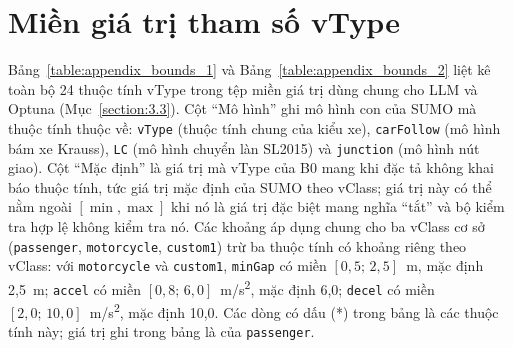 \documentclass[../main.tex]{subfiles}
\begin{document}
\section{Miền giá trị tham số vType}
\label{section:appendix_bounds}

Bảng~\ref{table:appendix_bounds_1} và Bảng~\ref{table:appendix_bounds_2} liệt kê toàn bộ 24 thuộc tính vType trong tệp miền giá trị dùng chung cho LLM và Optuna (Mục~\ref{section:3.3}). Cột ``Mô hình'' ghi mô hình con của SUMO mà thuộc tính thuộc về: \texttt{vType} (thuộc tính chung của kiểu xe), \texttt{carFollow} (mô hình bám xe Krauss), \texttt{LC} (mô hình chuyển làn SL2015) và \texttt{junction} (mô hình nút giao). Cột ``Mặc định'' là giá trị mà vType của B0 mang khi đặc tả không khai báo thuộc tính, tức giá trị mặc định của SUMO theo vClass; giá trị này có thể nằm ngoài $[\min,\max]$ khi nó là giá trị đặc biệt mang nghĩa ``tắt'' và bộ kiểm tra hợp lệ không kiểm tra nó. Các khoảng áp dụng chung cho ba vClass cơ sở (\texttt{passenger}, \texttt{motorcycle}, \texttt{custom1}) trừ ba thuộc tính có khoảng riêng theo vClass: với \texttt{motorcycle} và \texttt{custom1}, \texttt{minGap} có miền $[0{,}5;\,2{,}5]$~m, mặc định 2,5~m; \texttt{accel} có miền $[0{,}8;\,6{,}0]$~m/s\textsuperscript{2}, mặc định 6,0; \texttt{decel} có miền $[2{,}0;\,10{,}0]$~m/s\textsuperscript{2}, mặc định 10,0. Các dòng có dấu (*) trong bảng là các thuộc tính này; giá trị ghi trong bảng là của \texttt{passenger}.
\end{document}
